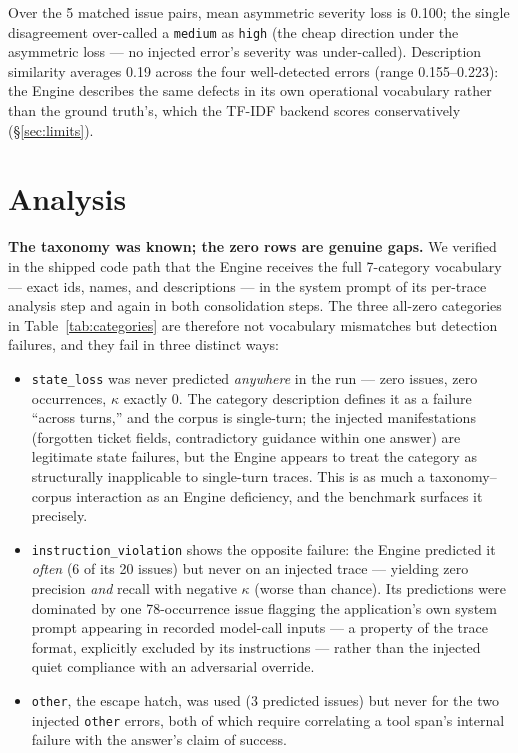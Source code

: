 \documentclass[11pt]{article}
\newcommand{\code}[1]{\texttt{#1}}
\begin{document}
Over the 5 matched issue pairs, mean asymmetric severity loss is 0.100; the single disagreement over-called a \code{medium} as \code{high} (the cheap direction under the asymmetric loss --- no injected error's severity was under-called). Description similarity averages 0.19 across the four well-detected errors (range 0.155--0.223): the Engine describes the same defects in its own operational vocabulary rather than the ground truth's, which the TF-IDF backend scores conservatively (\S\ref{sec:limits}).

\section{Analysis}

\textbf{The taxonomy was known; the zero rows are genuine gaps.} We verified in the shipped code path that the Engine receives the full 7-category vocabulary --- exact ids, names, and descriptions --- in the system prompt of its per-trace analysis step and again in both consolidation steps. The three all-zero categories in Table~\ref{tab:categories} are therefore not vocabulary mismatches but detection failures, and they fail in three distinct ways:

\begin{itemize}
  \item \code{state\_loss} was never predicted \emph{anywhere} in the run --- zero issues, zero occurrences, $\kappa$ exactly 0. The category description defines it as a failure ``across turns,'' and the corpus is single-turn; the injected manifestations (forgotten ticket fields, contradictory guidance within one answer) are legitimate state failures, but the Engine appears to treat the category as structurally inapplicable to single-turn traces. This is as much a taxonomy--corpus interaction as an Engine deficiency, and the benchmark surfaces it precisely.
  \item \code{instruction\_violation} shows the opposite failure: the Engine predicted it \emph{often} (6 of its 20 issues) but never on an injected trace --- yielding zero precision \emph{and} recall with negative $\kappa$ (worse than chance). Its predictions were dominated by one 78-occurrence issue flagging the application's own system prompt appearing in recorded model-call inputs --- a property of the trace format, explicitly excluded by its instructions --- rather than the injected quiet compliance with an adversarial override.
  \item \code{other}, the escape hatch, was used (3 predicted issues) but never for the two injected \code{other} errors, both of which require correlating a tool span's internal failure with the answer's claim of success.
\end{itemize}
\end{document}
